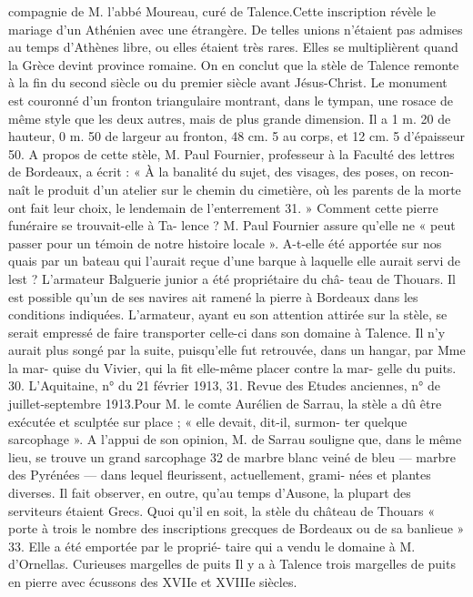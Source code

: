 \documentclass[a4paper,11pt]{book}
\begin{document}
compagnie de M. l'abbé Moureau, curé de Talence.Cette inscription révèle le mariage d'un Athénien avec
une étrangère. De telles unions n'étaient pas admises au
temps d'Athènes libre, ou elles étaient très rares. Elles se
multiplièrent quand la Grèce devint province romaine. On
en conclut que la stèle de Talence remonte à la fin du
second siècle ou du premier siècle avant Jésus-Christ.
Le monument est couronné d'un fronton triangulaire
montrant, dans le tympan, une rosace de même style que
les deux autres, mais de plus grande dimension. Il a
1 m. 20 de hauteur, 0 m. 50 de largeur au fronton, 48 cm. 5
au corps, et 12 cm. 5 d'épaisseur 50.
A propos de cette stèle, M. Paul Fournier, professeur à
la Faculté des lettres de Bordeaux, a écrit :
« À la banalité du sujet, des visages, des poses, on recon-
naît le produit d'un atelier sur le chemin du cimetière, où
les parents de la morte ont fait leur choix, le lendemain
de l'enterrement 31. »
Comment cette pierre funéraire se trouvait-elle à Ta-
lence ? M. Paul Fournier assure qu'elle ne « peut passer
pour un témoin de notre histoire locale ». A-t-elle été
apportée sur nos quais par un bateau qui l'aurait reçue
d'une barque à laquelle elle aurait servi de lest ?
L'armateur Balguerie junior a été propriétaire du châ-
teau de Thouars. Il est possible qu'un de ses navires ait
ramené la pierre à Bordeaux dans les conditions indiquées.
L'armateur, ayant eu son attention attirée sur la stèle,
se serait empressé de faire transporter celle-ci dans son
domaine à Talence. Il n'y aurait plus songé par la suite,
puisqu'elle fut retrouvée, dans un hangar, par Mme la mar-
quise du Vivier, qui la fit elle-même placer contre la mar-
gelle du puits.
30. L'Aquitaine, n° du 21 février 1913,
31. Revue des Etudes anciennes, n° de juillet-septembre 1913.Pour M. le comte Aurélien de Sarrau, la stèle a dû être
exécutée et sculptée sur place ; « elle devait, dit-il, surmon-
ter quelque sarcophage ». A l'appui de son opinion, M. de
Sarrau souligne que, dans le même lieu, se trouve un grand
sarcophage 32 de marbre blanc veiné de bleu — marbre des
Pyrénées
— dans lequel fleurissent, actuellement, grami-
nées et plantes diverses. Il fait observer, en outre, qu'au
temps d'Ausone, la plupart des serviteurs étaient Grecs.
Quoi qu'il en soit, la stèle du château de Thouars « porte
à trois le nombre des inscriptions grecques de Bordeaux
ou de sa banlieue » 33. Elle a été emportée par le proprié-
taire qui a vendu le domaine à M. d'Ornellas.
Curieuses margelles de puits
Il y a à Talence trois margelles de puits en pierre avec
écussons des XVIIe et XVIIIe siècles.
\end{document}
